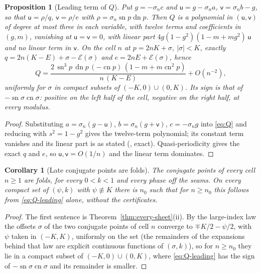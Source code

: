 \documentclass[11pt]{article}
\newtheorem{proposition}[theorem]{Proposition}
\newtheorem{corollary}[theorem]{Corollary}
\theoremstyle{remark}
\newcommand{\sn}{\operatorname{sn}}
\newcommand{\cn}{\operatorname{cn}}
\newcommand{\dn}{\operatorname{dn}}
\newcommand{\epsi}{\mathcal{E}}
\begin{document}
\begin{proposition}[Leading term of $Q$]\label{prop:leading}
Put $g=-\sigma_nc$ and $\mathsf u=g-\sigma_na$, $\mathsf v=\sigma_nb-g$, so that
$\mathsf u=\rho/q$, $\mathsf v=\rho/e$ with $\rho=\sigma_n\sn p\dn p$.  Then $Q$
is a polynomial in $(\mathsf u,\mathsf v)$ of degree at most three in each
variable, with twelve terms and coefficients in $(g,m)$, vanishing at
$\mathsf u=\mathsf v=0$, with linear part
$4g(1-g^2)(1-m+mg^2)\,\mathsf u$ and no linear term in $\mathsf v$.  On the
cell $n$ at $p=2nK+\sigma$, $|\sigma|<K$, exactly
$q=2n(K-E)+\sigma-\epsi(\sigma)$ and $e=2nE+\epsi(\sigma)$, hence
\begin{equation}\label{eq:Q-leading}
 Q=\frac{2\,\sn^3p\,\dn p\,(-\cn p)\,(1-m+m\cn^2p)}{n\,(K-E)}+O(n^{-2}),
\end{equation}
uniformly for $\sigma$ in compact subsets of $(-K,0)\cup(0,K)$.  Its
sign is that of $-\sn\sigma\cn\sigma$: positive on the left half of the
cell, negative on the right half, at every modulus.
\end{proposition}
\begin{proof}
Substituting $a=\sigma_n(g-\mathsf u)$, $b=\sigma_n(g+\mathsf v)$, $c=-\sigma_ng$
into \eqref{eq:Q} and reducing with $s^2=1-g^2$ gives the twelve-term
polynomial; its constant term vanishes and its linear part is as stated
(, exact).  Quasi-periodicity gives the exact
$q$ and $e$, so $\mathsf u,\mathsf v=O(1/n)$ and the linear term dominates.
\end{proof}

\begin{corollary}[Late conjugate points are folds]\label{cor:late-folds}
The conjugate points of every cell $n\ge1$ are folds, for every
$0<k<1$ and every phase off the seams.  On every compact set of $(\psi,k)$
with $\psi\not\equiv K$ there is $n_0$ such that for $n\ge n_0$ this follows
from \eqref{eq:Q-leading} alone, without the certificates.
\end{corollary}
\begin{proof}
The first sentence is Theorem~\ref{thm:every-sheet}(ii).  By the
large-index law \cite[Theorem 5.1(ii)]{SE2FirstConjugate} the offsets
$\sigma$ of the two conjugate points of cell $n$ converge to
$\mp K/2-\psi/2$, with $\psi$ taken in $(-K,K)$, uniformly on the set
(the remainders of the expansions behind that law are explicit continuous
functions of $(\sigma,k)$), so for $n\ge n_0$ they lie in a compact subset
of $(-K,0)\cup(0,K)$, where \eqref{eq:Q-leading} has the sign of
$-\sn\sigma\cn\sigma$ and its remainder is smaller.
\end{proof}
\end{document}
